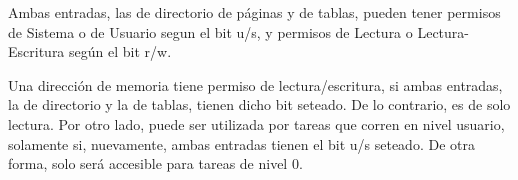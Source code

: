 Ambas entradas, las de directorio de páginas y de tablas, pueden tener permisos de Sistema o de Usuario segun el bit u/s, y permisos de Lectura o Lectura-Escritura según el bit r/w.

Una dirección de memoria tiene permiso de lectura/escritura, si ambas entradas, la de directorio y la de tablas, tienen dicho bit seteado. De lo contrario, es de solo lectura. Por otro lado, puede ser utilizada por tareas que corren en nivel usuario, solamente si, nuevamente, ambas entradas tienen el bit u/s seteado. De otra forma, solo será accesible para tareas de nivel 0.
